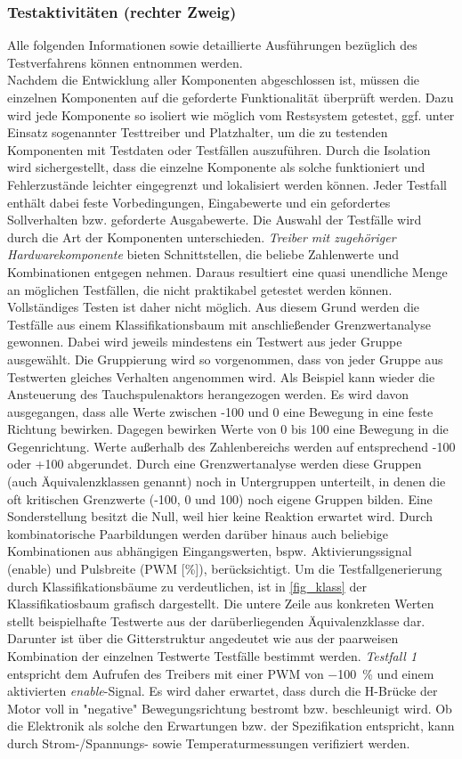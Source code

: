 \subsubsection{Testaktivitäten (rechter Zweig)}
Alle folgenden Informationen sowie detaillierte Ausführungen bezüglich des Testverfahrens können \cite{BasSof} entnommen werden.\\
Nachdem die Entwicklung aller Komponenten abgeschlossen ist, müssen die einzelnen Komponenten auf die geforderte Funktionalität überprüft werden. Dazu wird jede Komponente so isoliert wie möglich vom Restsystem getestet, ggf. unter Einsatz sogenannter Testtreiber und Platzhalter, um die zu testenden Komponenten mit Testdaten oder Testfällen auszuführen. Durch die Isolation wird sichergestellt, dass die einzelne Komponente als solche funktioniert und Fehlerzustände leichter eingegrenzt und lokalisiert werden können. Jeder Testfall enthält dabei feste Vorbedingungen, Eingabewerte und ein gefordertes Sollverhalten bzw. geforderte Ausgabewerte. Die Auswahl der Testfälle wird durch die Art der Komponenten unterschieden. \textit{Treiber mit zugehöriger Hardwarekomponente} bieten Schnittstellen, die beliebe Zahlenwerte und Kombinationen entgegen nehmen. Daraus resultiert eine quasi unendliche Menge an möglichen Testfällen, die nicht praktikabel getestet werden können. Vollständiges Testen ist daher nicht möglich. Aus diesem Grund werden die Testfälle aus einem Klassifikationsbaum mit anschließender Grenzwertanalyse gewonnen. Dabei wird jeweils mindestens ein Testwert aus jeder Gruppe ausgewählt. Die Gruppierung wird so vorgenommen, dass von jeder Gruppe aus Testwerten gleiches Verhalten angenommen wird. Als Beispiel kann wieder die Ansteuerung des Tauchspulenaktors herangezogen werden. Es wird davon ausgegangen, dass alle Werte zwischen -100 und 0 eine Bewegung in eine feste Richtung bewirken. Dagegen bewirken Werte von 0 bis 100 eine Bewegung in die Gegenrichtung. Werte außerhalb des Zahlenbereichs werden auf entsprechend -100 oder +100 abgerundet. Durch eine Grenzwertanalyse werden diese Gruppen (auch Äquivalenzklassen genannt) noch in Untergruppen unterteilt, in denen die oft kritischen Grenzwerte (-100, 0 und 100) noch eigene Gruppen bilden. Eine Sonderstellung besitzt die Null, weil hier keine Reaktion erwartet wird. Durch kombinatorische Paarbildungen werden darüber hinaus auch beliebige Kombinationen aus abhängigen Eingangswerten, bspw. Aktivierungssignal (enable) und Pulsbreite (PWM [\%]), berücksichtigt. Um die Testfallgenerierung durch Klassifikationsbäume zu verdeutlichen, ist in \autoref{fig_klass} der Klassifikatiosbaum grafisch dargestellt. Die untere Zeile aus konkreten Werten stellt beispielhafte Testwerte aus der darüberliegenden Äquivalenzklasse dar. Darunter ist über die Gitterstruktur angedeutet wie aus der paarweisen Kombination der einzelnen Testwerte Testfälle bestimmt werden. \textit{Testfall 1} entspricht dem Aufrufen des Treibers mit einer PWM von \SI{-100}{\%} und einem aktivierten \textit{enable}-Signal. Es wird daher erwartet, dass durch die H-Brücke der Motor voll in "negative" Bewegungsrichtung bestromt bzw. beschleunigt wird. Ob die Elektronik als solche den Erwartungen bzw. der Spezifikation entspricht, kann durch Strom-/Spannungs- sowie Temperaturmessungen verifiziert werden. 
